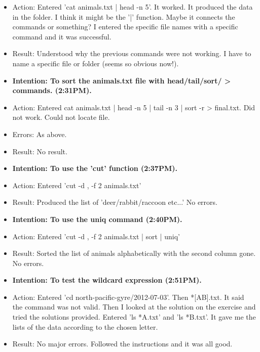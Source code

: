 \documentclass[a4paper,12pt]{article}
\begin{document}
\begin{itemize}
\begin{itemize}
\item Action: Entered 'cat animals.txt | head -n 5'. It worked. It produced the data in the folder. I think it might be the '|' function. Maybe it connects the commands or something? I entered the specific file names with a specific command and it was successful.

\item Result: Understood why the previous commands were not working. I have to name a specific file or folder (seems so obvious now!). 

\item \textbf{Intention: To sort the animals.txt file with head/tail/sort/ > commands. (2:31PM).}

\item Action: Entered cat animals.txt | head -n 5 | tail -n 3 | sort -r > final.txt. Did not work. Could not locate file. 

\item Errors: As above.

\item Result: No result. 

\item \textbf {Intention: To use the 'cut' function (2:37PM).}

\item Action: Entered 'cut -d , -f 2 animals.txt'

\item Result: Produced the list of 'deer/rabbit/raccoon etc...' No errors. 

\item \textbf{Intention: To use the uniq command (2:40PM).}

\item Action: Entered 'cut -d , -f 2 animals.txt | sort | uniq'

\item Result: Sorted the list of animals alphabetically with the second column gone. No errors. 

\item \textbf{Intention: To test the wildcard expression (2:51PM).} 

\item Action: Entered 'cd north-pacific-gyre/2012-07-03'. Then *[AB].txt. It said the command was not valid. Then I looked at the solution on the exercise and tried the solutions provided. Entered 'ls *A.txt' and 'ls *B.txt'. It gave me the lists of the data according to the chosen letter. 

\item Result: No major errors. Followed the instructions and it was all good. 


\end{itemize}
\end{itemize}
\end{document}

